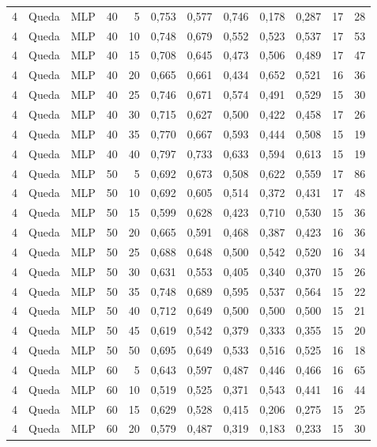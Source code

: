 \begin{longtable}{@{}rllrrrrrrrrr@{}}
4 & Queda & MLP & 40 & 5 & 0,753 & 0,577 & 0,746 & 0,178 & 0,287 & 17 & 28 \\
4 & Queda & MLP & 40 & 10 & 0,748 & 0,679 & 0,552 & 0,523 & 0,537 & 17 & 53 \\
4 & Queda & MLP & 40 & 15 & 0,708 & 0,645 & 0,473 & 0,506 & 0,489 & 17 & 47 \\
4 & Queda & MLP & 40 & 20 & 0,665 & 0,661 & 0,434 & 0,652 & 0,521 & 16 & 36 \\
4 & Queda & MLP & 40 & 25 & 0,746 & 0,671 & 0,574 & 0,491 & 0,529 & 15 & 30 \\
4 & Queda & MLP & 40 & 30 & 0,715 & 0,627 & 0,500 & 0,422 & 0,458 & 17 & 26 \\
4 & Queda & MLP & 40 & 35 & 0,770 & 0,667 & 0,593 & 0,444 & 0,508 & 15 & 19 \\
4 & Queda & MLP & 40 & 40 & 0,797 & 0,733 & 0,633 & 0,594 & 0,613 & 15 & 19 \\
4 & Queda & MLP & 50 & 5 & 0,692 & 0,673 & 0,508 & 0,622 & 0,559 & 17 & 86 \\
4 & Queda & MLP & 50 & 10 & 0,692 & 0,605 & 0,514 & 0,372 & 0,431 & 17 & 48 \\
4 & Queda & MLP & 50 & 15 & 0,599 & 0,628 & 0,423 & 0,710 & 0,530 & 15 & 36 \\
4 & Queda & MLP & 50 & 20 & 0,665 & 0,591 & 0,468 & 0,387 & 0,423 & 16 & 36 \\
4 & Queda & MLP & 50 & 25 & 0,688 & 0,648 & 0,500 & 0,542 & 0,520 & 16 & 34 \\
4 & Queda & MLP & 50 & 30 & 0,631 & 0,553 & 0,405 & 0,340 & 0,370 & 15 & 26 \\
4 & Queda & MLP & 50 & 35 & 0,748 & 0,689 & 0,595 & 0,537 & 0,564 & 15 & 22 \\
4 & Queda & MLP & 50 & 40 & 0,712 & 0,649 & 0,500 & 0,500 & 0,500 & 15 & 21 \\
4 & Queda & MLP & 50 & 45 & 0,619 & 0,542 & 0,379 & 0,333 & 0,355 & 15 & 20 \\
4 & Queda & MLP & 50 & 50 & 0,695 & 0,649 & 0,533 & 0,516 & 0,525 & 16 & 18 \\
4 & Queda & MLP & 60 & 5 & 0,643 & 0,597 & 0,487 & 0,446 & 0,466 & 16 & 65 \\
4 & Queda & MLP & 60 & 10 & 0,519 & 0,525 & 0,371 & 0,543 & 0,441 & 16 & 44 \\
4 & Queda & MLP & 60 & 15 & 0,629 & 0,528 & 0,415 & 0,206 & 0,275 & 15 & 25 \\
4 & Queda & MLP & 60 & 20 & 0,579 & 0,487 & 0,319 & 0,183 & 0,233 & 15 & 30 \\

\end{longtable}
